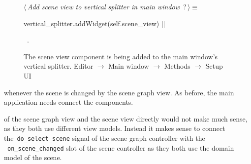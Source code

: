 \documentclass[%
    a4paper,    %
    justified,  %
    nobib,      %
    openany     %
]{tufte-book}
\makeatletter
\renewcommand{\label}[1]{\@tufte@label{##1}}%
\makeatother
\begin{document}
\begin{figure}
\begin{flushleft} \small
\begin{minipage}{\linewidth}\label{scrap84}\raggedright\small
{} $\langle\,${\itshape Add scene view to vertical splitter in main window}\nobreak\ {\footnotesize {?}}$\,\rangle\equiv$
\vspace{-1ex}
\begin{pythoncode}
vertical_splitter.addWidget(self.scene_view)
|\NWsep|
\end{pythoncode}
\vspace{1.5ex}
\footnotesize
\begin{list}{}{\setlength{\itemsep}{-\parsep}\setlength{\itemindent}{-\leftmargin}}
\item \NWtxtMacroRefIn\ .

\item{}
\end{list}
\end{minipage}\vspace{4ex}
\end{flushleft}
\caption{The scene view component is being added to the main window's vertical
  splitter.
  \newline{}\newline{}Editor $\rightarrow$ Main window $\rightarrow$
  Methods $\rightarrow$ Setup UI}
\label{editor:lst:main-window:methods:setup-ui:add-scene-view-to-splitter}
\end{figure}

 whenever the scene is
changed by the scene graph view. As before, the main application needs connect
the components.

 of the scene graph view and the scene
view directly would not make much sense, as they both use different view models.
Instead it makes sense to connect the~\verb=do_select_scene= signal of the scene
graph controller with the ~\verb=on_scene_changed= slot of the scene controller
as they both use the domain model of the scene.
\end{document}
